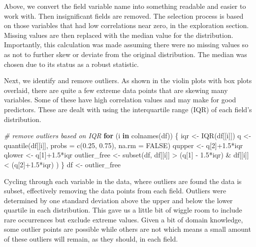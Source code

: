 \documentclass[
]{article}
\newenvironment{Shaded}{\begin{snugshade}}{\end{snugshade}}
\newcommand{\AttributeTok}[1]{\textcolor[rgb]{0.77,0.63,0.00}{#1}}
\newcommand{\CommentTok}[1]{\textcolor[rgb]{0.56,0.35,0.01}{\textit{#1}}}
\newcommand{\ConstantTok}[1]{\textcolor[rgb]{0.00,0.00,0.00}{#1}}
\newcommand{\ControlFlowTok}[1]{\textcolor[rgb]{0.13,0.29,0.53}{\textbf{#1}}}
\newcommand{\DecValTok}[1]{\textcolor[rgb]{0.00,0.00,0.81}{#1}}
\newcommand{\FloatTok}[1]{\textcolor[rgb]{0.00,0.00,0.81}{#1}}
\newcommand{\FunctionTok}[1]{\textcolor[rgb]{0.00,0.00,0.00}{#1}}
\newcommand{\NormalTok}[1]{#1}
\newcommand{\OtherTok}[1]{\textcolor[rgb]{0.56,0.35,0.01}{#1}}
\newcommand{\SpecialCharTok}[1]{\textcolor[rgb]{0.00,0.00,0.00}{#1}}
\begin{document}
Above, we convert the field variable name into something readable and
easier to work with. Then insignificant fields are removed. The
selection process is based on those variables that had low correlations
near zero, in the exploration section. Missing values are then replaced
with the median value for the distribution. Importantly, this
calculation was made assuming there were no missing values so as not to
further skew or deviate from the original distribution. The median was
chosen due to its status as a robust statistic.

Next, we identify and remove outliers. As shown in the violin plots with
box plots overlaid, there are quite a few extreme data points that are
skewing many variables. Some of these have high correlation values and
may make for good predictors. These are dealt with using the
interquartile range (IQR) of each field's distribution.

\begin{Shaded}
\begin{Highlighting}[]
\CommentTok{\# remove outliers based on IQR}
\ControlFlowTok{for}\NormalTok{ (i }\ControlFlowTok{in} \FunctionTok{colnames}\NormalTok{(df)) \{}
\NormalTok{  iqr }\OtherTok{\textless{}{-}} \FunctionTok{IQR}\NormalTok{(df[[i]])}
\NormalTok{  q }\OtherTok{\textless{}{-}} \FunctionTok{quantile}\NormalTok{(df[[i]], }\AttributeTok{probs =} \FunctionTok{c}\NormalTok{(}\FloatTok{0.25}\NormalTok{, }\FloatTok{0.75}\NormalTok{), }\AttributeTok{na.rm =} \ConstantTok{FALSE}\NormalTok{)}
\NormalTok{  qupper }\OtherTok{\textless{}{-}}\NormalTok{ q[}\DecValTok{2}\NormalTok{]}\SpecialCharTok{+}\FloatTok{1.5}\SpecialCharTok{*}\NormalTok{iqr}
\NormalTok{  qlower }\OtherTok{\textless{}{-}}\NormalTok{ q[}\DecValTok{1}\NormalTok{]}\SpecialCharTok{+}\FloatTok{1.5}\SpecialCharTok{*}\NormalTok{iqr}
\NormalTok{  outlier\_free }\OtherTok{\textless{}{-}} \FunctionTok{subset}\NormalTok{(df, df[[i]] }\SpecialCharTok{\textgreater{}}\NormalTok{ (q[}\DecValTok{1}\NormalTok{] }\SpecialCharTok{{-}} \FloatTok{1.5}\SpecialCharTok{*}\NormalTok{iqr) }\SpecialCharTok{\&}\NormalTok{ df[[i]] }\SpecialCharTok{\textless{}}\NormalTok{ (q[}\DecValTok{2}\NormalTok{]}\SpecialCharTok{+}\FloatTok{1.5}\SpecialCharTok{*}\NormalTok{iqr) )}
\NormalTok{\}}
\NormalTok{df }\OtherTok{\textless{}{-}}\NormalTok{ outlier\_free}
\end{Highlighting}
\end{Shaded}

Cycling through each variable in the data, where outliers are found the
data is subset, effectively removing the data points from each field.
Outliers were determined by one standard deviation above the upper and
below the lower quartile in each distribution. This gave us a little bit
of wiggle room to include rare occurrences but exclude extreme values.
Given a bit of domain knowledge, some outlier points are possible while
others are not which means a small amount of these outliers will remain,
as they should, in each field.
\end{document}
